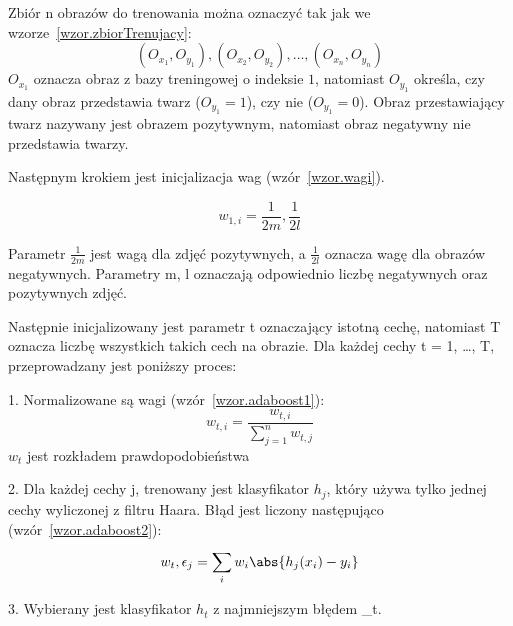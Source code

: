 \documentclass[a4paper,twoside,12pt]{book}
\begin{document}
    Zbiór n obrazów do trenowania można oznaczyć tak jak we wzorze~\ref{wzor.zbiorTrenujacy}:
    \large
    \begin{equation}
        (O_{x_1}, O_{y_1}), (O_{x_2}, O_{y_2}), \ldots, (O_{x_n}, O_{y_n})
        \label{wzor.zbiorTrenujacy}
    \end{equation}
    \normalsize
    $O_{x_1}$ oznacza obraz z bazy treningowej o indeksie $1$, natomiast $O_{y_1}$ określa, czy dany obraz
    przedstawia twarz ($O_{y_1} = 1$), czy nie ($O_{y_1} = 0$). Obraz przestawiający twarz nazywany jest obrazem
    pozytywnym, natomiast obraz negatywny nie przedstawia twarzy.

    Następnym krokiem jest inicjalizacja wag (wzór~\ref{wzor.wagi}).

    \large
    \begin{equation}
        w_{1,i} = \frac{1}{2m}, \frac{1}{2l}
        \label{wzor.wagi}
    \end{equation}
    \normalsize

    Parametr $\frac{1}{2m}$ jest wagą dla zdjęć pozytywnych, a $\frac{1}{2l}$ oznacza wagę dla obrazów negatywnych.
    Parametry m, l oznaczają odpowiednio liczbę negatywnych oraz pozytywnych zdjęć.

    Następnie inicjalizowany jest parametr t oznaczający istotną cechę, natomiast T oznacza liczbę wszystkich takich
    cech na obrazie.
    Dla każdej
    cechy t = 1, \ldots, T, przeprowadzany jest poniższy proces:

    1. Normalizowane są wagi (wzór~\ref{wzor.adaboost1}):
    \large
    \begin{equation}
        w_{t,i} = \frac{w_{t,i}}{\sum_{j=1}^{n}w_{t,j}}
        \label{wzor.adaboost1}
    \end{equation}
    \normalsize
    $w_{t}$ jest rozkładem prawdopodobieństwa

    2. Dla każdej cechy j, trenowany jest klasyfikator $h_{j}$, który używa tylko jednej cechy wyliczonej z filtru Haara.
    Błąd jest liczony następująco (wzór~\ref{wzor.adaboost2}):
    \large
    \begin{equation}
        w_{t}, \epsilon_{j} = \sum_{i}^{}w_{i} \abs{h_{j}(x_{i}) - y_{i}}
        \label{wzor.adaboost2}
    \end{equation}
    \normalsize

    3. Wybierany jest klasyfikator $h_{t}$ z najmniejszym błędem \epsilon_{t}.
\end{document}
